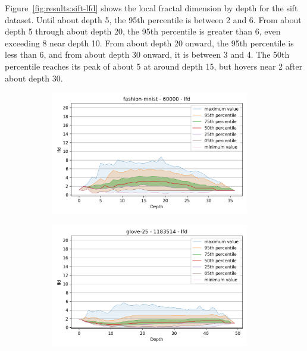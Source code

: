 Figure~\ref{fig:results:sift-lfd} shows the local fractal dimension by depth for the sift dataset. 
Until about depth 5, the 95th percentile is between 2 and 6. From about depth 5 through about depth 20, the 95th percentile is greater than 6, even exceeding 8 near depth 10. 
From about depth 20 onward, the 95th percentile is less than 6, and from about depth 30 onward, it is between 3 and 4. 
The 50th percentile reaches its peak of about 5 at around depth 15, but hovers near 2 after about depth 30. 





\begin{figure}
    \begin{subfigure}[b]{0.47\textwidth}
    \includegraphics[width=0.95\textwidth]{images/lfd_plots/fashion-mnist-60000-lfd.png}\\
    \label{fig:results:fashion-mnist-lfd}
    \end{subfigure}%
    \begin{subfigure}[b]{0.47\textwidth}
    \includegraphics[width=0.95\textwidth]{images/lfd_plots/glove-25-1183514-lfd.png}\\

\end{subfigure}
\end{figure}
